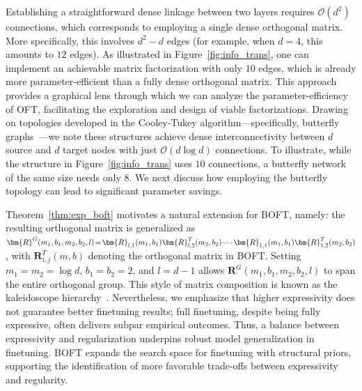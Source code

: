 Establishing a straightforward dense linkage between two layers requires $\mathcal{O}(d^2)$ connections, which corresponds to employing a single dense orthogonal matrix. More specifically, this involves $d^2 - d$ edges (for example, when $d=4$, this amounts to $12$ edges). As illustrated in Figure~\ref{fig:info_trans}, one can implement an achievable matrix factorization with only $10$ edges, which is already more parameter-efficient than a fully dense orthogonal matrix. This approach provides a graphical lens through which we can analyze the parameter-efficiency of OFT, facilitating the exploration and design of viable factorizations. Drawing on topologies developed in the Cooley-Tukey algorithm—specifically, butterfly graphs~\cite{cooley1965algorithm}—we note these structures achieve dense interconnectivity between $d$ source and $d$ target nodes with just $\mathcal{O}(d\log d)$ connections. To illustrate, while the structure in Figure~\ref{fig:info_trans} uses $10$ connections, a butterfly network of the same size needs only $8$. We next discuss how employing the butterfly topology can lead to significant parameter savings.

Theorem~\ref{thm:exp_boft} motivates a natural extension for BOFT, namely: the resulting orthogonal matrix is generalized as $\thickmuskip=2mu \medmuskip=2mu \bm{R}^G(m_1,b_1,m_2,b_2,l)=\bm{R}_{l,1}(m_1,b_1)\bm{R}_{l,2}^T(m_2,b_2)\cdots\bm{R}_{1,1}(m_1,b_1)\bm{R}_{1,2}^T(m_2,b_2)$, with $\bm{R}_{i,j}^T(m,b)$ denoting the orthogonal matrix in BOFT. Setting $m_1=m_2=\log d$, $b_1=b_2=2$, and $l=d-1$ allows $\bm{R}^G(m_1,b_1,m_2,b_2,l)$ to span the entire orthogonal group. This style of matrix composition is known as the kaleidoscope hierarchy~\cite{dao2019kaleidoscope}. Nevertheless, we emphasize that higher expressivity does not guarantee better finetuning results; full finetuning, despite being fully expressive, often delivers subpar empirical outcomes. Thus, a balance between expressivity and regularization underpins robust model generalization in finetuning. BOFT expands the search space for finetuning with structural priors, supporting the identification of more favorable trade-offs between expressivity and regularity.

